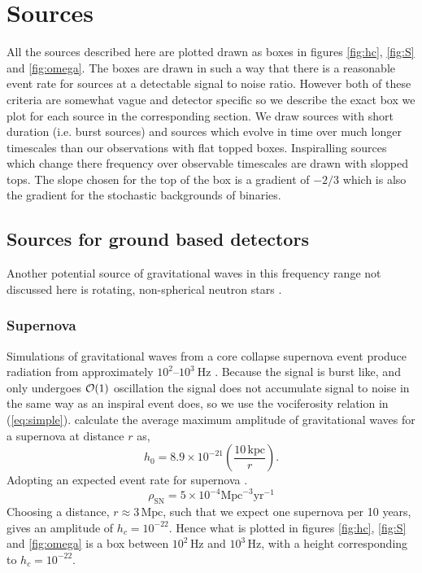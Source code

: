 \section{Sources}\label{sec:sources}

All the sources described here are plotted drawn as boxes in figures \ref{fig:hc}, \ref{fig:S} and \ref{fig:omega}. The boxes are drawn in such a way that there is a reasonable event rate for sources at a detectable signal to noise ratio. However both of these criteria are somewhat vague and detector specific so we describe the exact box we plot for each source in the corresponding section. We draw sources with short duration (i.e. burst sources) and sources which evolve in time over much longer timescales than our observations with flat topped boxes. Inspiralling sources which change there frequency over observable timescales are drawn with slopped tops. The slope chosen for the top of the box is a gradient of $-2/3$ which is also the gradient for the stochastic backgrounds of binaries. 

\subsection{Sources for ground based detectors}

Another potential source of gravitational waves in this frequency range not discussed here is rotating, non-spherical neutron stars \citep{2013ASPC..467...59S}.

\subsubsection{Supernova}
Simulations of gravitational waves from a core collapse supernova event produce radiation from approximately $10^{2}$--$10^{3}~\textrm{Hz}$ \citep{2002A&A...393..523D}. Because the signal is burst like, and only undergoes ${\cal{O}}(1)$ oscillation the signal does not accumulate signal to noise in the same way as an inspiral event does, so we use the vociferosity relation in (\ref{eq:simple}). \citet{2002A&A...393..523D} calculate the average maximum amplitude of gravitational waves for a supernova at distance $r$ as, 
\begin{equation}
h_{0}=8.9\times 10^{-21}\left( \frac{10 \,\textrm{kpc}}{r} \right).
\end{equation}
Adopting an expected event rate for supernova \citep[e.g.]{2013ASPC..467...59S}.
\begin{equation}\rho_{\textrm{SN}}=5\times10^{-4}\textrm{Mpc}^{-3}\textrm{yr}^{-1}
\end{equation}
Choosing a distance, $r\approx 3 \,\textrm{Mpc}$, such that we expect one supernova per 10 years, gives an amplitude of $h_{c}=10^{-22}$. Hence what is plotted in figures \ref{fig:hc}, \ref{fig:S} and \ref{fig:omega} is a box between $10^{2}\,\textrm{Hz}$ and $10^{3}\,\textrm{Hz}$, with a height corresponding to $h_{c}=10^{-22}$.

